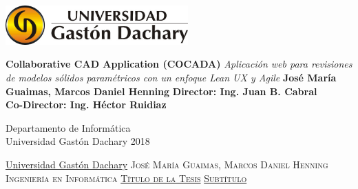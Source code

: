 \documentclass[a4paper,12pt]{report}
\newcommand{\linespacing}{1.5}
\renewcommand{\baselinestretch}{\linespacing}
\begin{document}




\thispagestyle{empty}
\begin{flushright}
\includegraphics[width=7cm]{Img/ugdlogo.jpg}
\end{flushright}	
\vskip40mm
\begin{center}
\huge\textbf{Collaborative CAD Application (COCADA)}
\vskip2mm
\large\textit{Aplicación web para revisiones de modelos sólidos paramétricos con un enfoque Lean UX y Agile}
\vskip5mm
\Large\textbf{José María Guaimas, Marcos Daniel Henning}
\vskip5mm
\Large\textbf{Director: Ing. Juan B. Cabral}\\
\Large\textbf{Co-Director: Ing. Héctor Ruidiaz}
\normalsize
\end{center}
\vfill
\begin{flushright}
\large
Departamento de Informática \\
Universidad Gastón Dachary 2018\\

\end{flushright}		


	



\thispagestyle{empty}
\newpage
\null\vskip10mm
\begin{center}
\large
\underline{Universidad Gastón Dachary}
\vskip20mm
\textsc{José María Guaimas, Marcos Daniel Henning}\\
\textsc{Ingeniería en Informática}
\vskip20mm
\underline{\textsc{Título de la Tesis}}
\vskip0mm
\underline{\textsc{Subtítulo}}
\vskip20mm
\vskip2mm
\end{center}
\renewcommand{\baselinestretch}{1.0}
\small\normalsize
\end{document}
